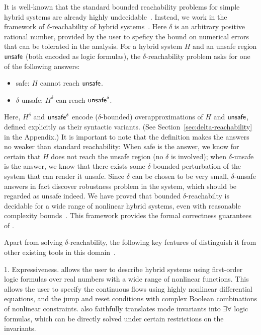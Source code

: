 It is well-known that the standard bounded reachability problems for
simple hybrid systems are already highly
undecidable~\cite{DBLP:conf/rex/AlurD91,DBLP:conf/hybrid/AlurCHH92}.
Instead, we work in the framework of $\delta$-reachability of hybrid systems~\cite{DBLP:journals/corr/GaoKCC14}.
Here $\delta$ is an arbitrary positive rational number, provided by the user to
speficy the bound on numerical errors that can be tolerated in the analysis.
For a hybrid system $H$ and an unsafe region $\mathsf{unsafe}$ (both encoded as logic formulas),
the $\delta$-reachability problem asks for one of the following answers:
\begin{itemize}
        \item {\sf safe}: $H$ cannot reach $\mathsf{unsafe}$.
        \item {\sf $\delta$-unsafe}: $H^{\delta}$ can reach $\mathsf{unsafe}^{\delta}$.
\end{itemize}
Here, $H^{\delta}$ and $\mathsf{unsafe}^{\delta}$ encode ($\delta$-bounded) overapproximations
of $H$ and $\mathsf{unsafe}$, defined explicitly as their syntactic variants. (See Section~\ref{sec:delta-reachability} in the Appendix.)
It is important to note that the definition makes the answers no weaker than standard reachability:
When {\sf safe} is the answer, we know for certain that $H$ does not reach
the unsafe region (no $\delta$ is involved); when {\sf $\delta$-unsafe} is the answer,
we know that there exists some $\delta$-bounded perturbation of the system that can render it unsafe.
Since $\delta$ can be chosen to be very small, {\sf$\delta$-unsafe} answers in fact
discover robustness problem in the system, which should be regarded as unsafe indeed.
We have proved that bounded $\delta$-reachabilty is decidable for a wide range
of nonlinear hybrid systems, even with reasonable complexity bounds~\cite{DBLP:journals/corr/GaoKCC14}.
This framework provides the formal correctness guarantees of \dReach{}.

Apart from solving $\delta$-reachability, the following key features of \dReach{}
distinguish it from other existing tools in this domain~\cite{DBLP:journals/jlp/FranzleTE10,DBLP:conf/cav/FrehseGDCRLRGDM11,DBLP:journals/tac/AlthoffK14,DBLP:conf/hybrid/Frehse05,DBLP:conf/icons/HerdeEFT08,DBLP:conf/rtss/ChenAS12}.

1. Expressiveness. \dReach{} allows the user to describe hybrid systems using first-order
logic formulas over real numbers with a wide range of nonlinear functions. This allows
the user to specify the continuous flows using highly nonlinear differential equations,
and the jump and reset conditions with complex Boolean combinations of nonlinear constraints.
\dReach{} also faithfully translates mode invariants into $\exists\forall$ logic formulas,
which can be directly solved under certain restrictions on the invariants.

